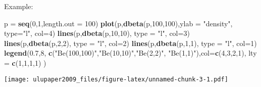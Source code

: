 \documentclass[
]{book}
\newenvironment{Shaded}{\begin{snugshade}}{\end{snugshade}}
\newcommand{\DataTypeTok}[1]{\textcolor[rgb]{0.13,0.29,0.53}{#1}}
\newcommand{\DecValTok}[1]{\textcolor[rgb]{0.00,0.00,0.81}{#1}}
\newcommand{\FloatTok}[1]{\textcolor[rgb]{0.00,0.00,0.81}{#1}}
\newcommand{\KeywordTok}[1]{\textcolor[rgb]{0.13,0.29,0.53}{\textbf{#1}}}
\newcommand{\NormalTok}[1]{#1}
\newcommand{\StringTok}[1]{\textcolor[rgb]{0.31,0.60,0.02}{#1}}
\begin{document}
Example:

\begin{Shaded}
\begin{Highlighting}[]
\NormalTok{p =}\StringTok{ }\KeywordTok{seq}\NormalTok{(}\DecValTok{0}\NormalTok{,}\DecValTok{1}\NormalTok{,}\DataTypeTok{length.out =} \DecValTok{100}\NormalTok{)}
\KeywordTok{plot}\NormalTok{(p,}\KeywordTok{dbeta}\NormalTok{(p,}\DecValTok{100}\NormalTok{,}\DecValTok{100}\NormalTok{),}\DataTypeTok{ylab =} \StringTok{"density"}\NormalTok{, }\DataTypeTok{type=}\StringTok{"l"}\NormalTok{, }\DataTypeTok{col=}\DecValTok{4}\NormalTok{)}
\KeywordTok{lines}\NormalTok{(p,}\KeywordTok{dbeta}\NormalTok{(p,}\DecValTok{10}\NormalTok{,}\DecValTok{10}\NormalTok{), }\DataTypeTok{type =} \StringTok{"l"}\NormalTok{, }\DataTypeTok{col=}\DecValTok{3}\NormalTok{)}
\KeywordTok{lines}\NormalTok{(p,}\KeywordTok{dbeta}\NormalTok{(p,}\DecValTok{2}\NormalTok{,}\DecValTok{2}\NormalTok{), }\DataTypeTok{type =} \StringTok{"l"}\NormalTok{, }\DataTypeTok{col=}\DecValTok{2}\NormalTok{)}
\KeywordTok{lines}\NormalTok{(p,}\KeywordTok{dbeta}\NormalTok{(p,}\DecValTok{1}\NormalTok{,}\DecValTok{1}\NormalTok{), }\DataTypeTok{type =} \StringTok{"l"}\NormalTok{, }\DataTypeTok{col=}\DecValTok{1}\NormalTok{)}
\KeywordTok{legend}\NormalTok{(}\FloatTok{0.7}\NormalTok{,}\DecValTok{8}\NormalTok{, }\KeywordTok{c}\NormalTok{(}\StringTok{"Be(100,100)"}\NormalTok{,}\StringTok{"Be(10,10)"}\NormalTok{,}\StringTok{"Be(2,2)"}\NormalTok{, }\StringTok{"Be(1,1)"}\NormalTok{),}\DataTypeTok{col=}\KeywordTok{c}\NormalTok{(}\DecValTok{4}\NormalTok{,}\DecValTok{3}\NormalTok{,}\DecValTok{2}\NormalTok{,}\DecValTok{1}\NormalTok{), }\DataTypeTok{lty =} \KeywordTok{c}\NormalTok{(}\DecValTok{1}\NormalTok{,}\DecValTok{1}\NormalTok{,}\DecValTok{1}\NormalTok{,}\DecValTok{1}\NormalTok{) )}
\end{Highlighting}
\end{Shaded}

\texttt{[image: ulupaper2009\_files/figure-latex/unnamed-chunk-3-1.pdf]}
\end{document}
